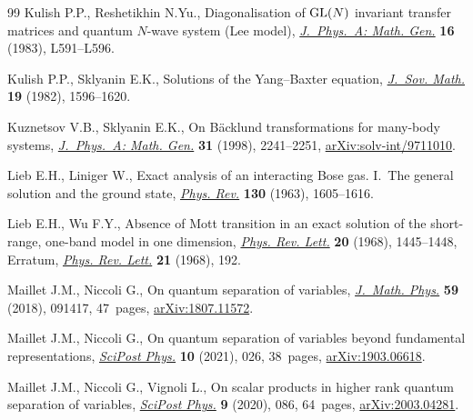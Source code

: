 \documentclass[pdftex]{sigma}%
\numberwithin{equation}{section}
\begin{document}
\begin{thebibliography}{99}
Kulish P.P., Reshetikhin N.Yu., Diagonalisation of {${\rm GL}(N)$} invariant
 transfer matrices and quantum {$N$}-wave system ({L}ee model),
 \href{https://doi.org/10.1088/0305-4470/16/16/001}{\textit{J.~Phys.~A: Math. Gen.}} \textbf{16} (1983), L591--L596.

Kulish P.P., Sklyanin E.K., Solutions of the {Y}ang--{B}axter equation,
 \href{https://doi.org/10.1007/BF01091463}{\textit{J.~Sov. Math.}} \textbf{19} (1982), 1596--1620.

Kuznetsov V.B., Sklyanin E.K., On {B}\"acklund transformations for many-body
 systems, \href{https://doi.org/10.1088/0305-4470/31/9/012}{\textit{J.~Phys.~A: Math. Gen.}} \textbf{31} (1998), 2241--2251,
 \href{https://arxiv.org/abs/solv-int/9711010}{arXiv:solv-int/9711010}.

Lieb E.H., Liniger W., Exact analysis of an interacting {B}ose gas. {I}.~{T}he
 general solution and the ground state, \href{https://doi.org/10.1103/PhysRev.130.1605}{\textit{Phys. Rev.}} \textbf{130}
 (1963), 1605--1616.

Lieb E.H., Wu F.Y., Absence of Mott transition in an exact solution of the
 short-range, one-band model in one dimension, \href{https://doi.org/10.1103/PhysRevLett.20.1445}{\textit{Phys. Rev. Lett.}}
 \textbf{20} (1968), 1445--1448, {E}rratum,
 \href{https://doi.org/10.1103/PhysRevLett.21.192.2}{\textit{Phys. Rev.
 Lett.}} \textbf{21} (1968), 192.

Maillet J.M., Niccoli G., On quantum separation of variables, \href{https://doi.org/10.1063/1.5050989}{\textit{J.~Math.
 Phys.}} \textbf{59} (2018), 091417, 47~pages, \href{https://arxiv.org/abs/1807.11572}{arXiv:1807.11572}.

Maillet J.M., Niccoli G., On quantum separation of variables beyond fundamental
 representations, \href{https://doi.org/10.21468/scipostphys.10.2.026}{\textit{SciPost Phys.}} \textbf{10} (2021), 026, 38~pages,
 \href{https://arxiv.org/abs/1903.06618}{arXiv:1903.06618}.

Maillet J.M., Niccoli G., Vignoli L., On scalar products in higher rank quantum
 separation of variables, \href{https://doi.org/10.21468/SciPostPhys.9.6.086}{\textit{SciPost Phys.}} \textbf{9} (2020), 086,
 64~pages, \href{https://arxiv.org/abs/2003.04281}{arXiv:2003.04281}.


\end{thebibliography}
\end{document}

